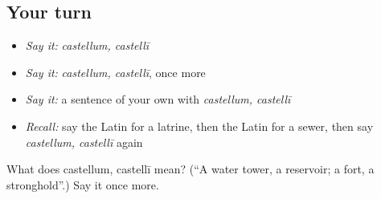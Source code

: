 \subsection*{Your turn}
\begin{itemize}
\raggedright
  \item \emph{Say it:} \emph{castellum, castellī}
  \item \emph{Say it:} \emph{castellum, castellī}, once more
  \item \emph{Say it:} a sentence of your own with \emph{castellum, castellī}
  \item \emph{Recall:} say the Latin for a latrine, then the Latin for a sewer, then say \emph{castellum, castellī} again
\end{itemize}

\begin{tcolorbox}[breakable,colback=teal!4,colframe=teal!35!black,title={Before you move on}]
What does castellum, castellī mean? (\textquotedblleft{}A water tower, a reservoir; a fort, a stronghold\textquotedblright{}.) Say it once more.
\end{tcolorbox}
